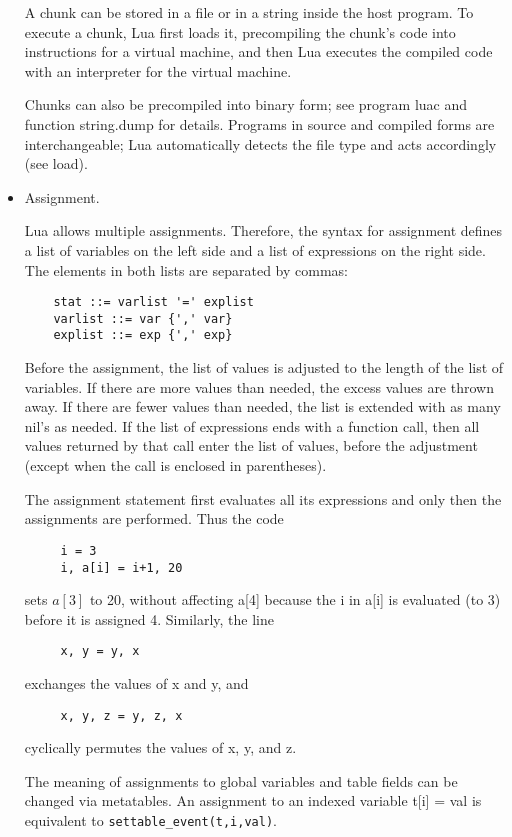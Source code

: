\begin{itemize}
A chunk can be stored in a file or in a string inside the host program. To execute a chunk, Lua first loads it, precompiling the chunk's code into instructions for a virtual machine, and then Lua executes the compiled code with an interpreter for the virtual machine.

Chunks can also be precompiled into binary form; see program luac and function string.dump for details. Programs in source and compiled forms are interchangeable; Lua automatically detects the file type and acts accordingly (see load).

\item Assignment.

Lua allows multiple assignments. Therefore, the syntax for assignment defines a list of variables on the left side and a list of expressions on the right side. The elements in both lists are separated by commas:
\begin{lstlisting}
	stat ::= varlist '=' explist
	varlist ::= var {',' var}
	explist ::= exp {',' exp}
\end{lstlisting}

Before the assignment, the list of values is adjusted to the length of the list of variables. If there are more values than needed, the excess values are thrown away. If there are fewer values than needed, the list is extended with as many nil's as needed. If the list of expressions ends with a function call, then all values returned by that call enter the list of values, before the adjustment (except when the call is enclosed in parentheses).

The assignment statement first evaluates all its expressions and only then the assignments are performed. Thus the code
\begin{lstlisting}
     i = 3
     i, a[i] = i+1, 20
\end{lstlisting}
sets $a[3]$ to 20, without affecting a[4] because the i in a[i] is evaluated (to 3) before it is assigned 4. Similarly, the line
\begin{lstlisting}
     x, y = y, x
\end{lstlisting}
exchanges the values of x and y, and
\begin{lstlisting}
     x, y, z = y, z, x
\end{lstlisting}
cyclically permutes the values of x, y, and z.

The meaning of assignments to global variables and table fields can be changed via metatables. An assignment to an indexed variable t[i] = val is equivalent to \verb=settable_event(t,i,val)=.


\end{itemize}
